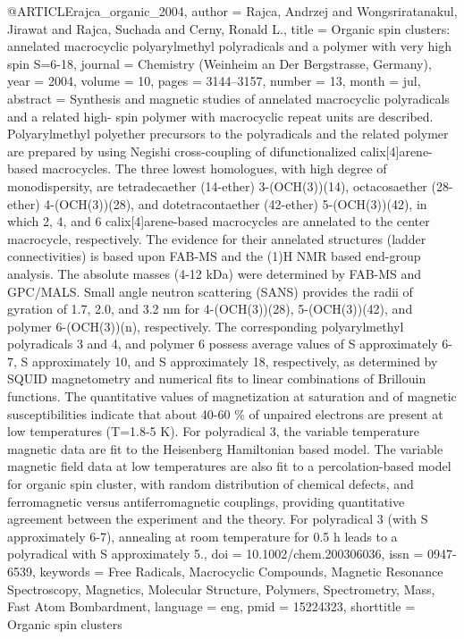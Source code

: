 @ARTICLE{rajca_organic_2004,
  author = {Rajca, Andrzej and Wongsriratanakul, Jirawat and Rajca, Suchada and
	Cerny, Ronald L.},
  title = {Organic spin clusters: annelated macrocyclic polyarylmethyl polyradicals
	and a polymer with very high spin {S}=6-18},
  journal = {Chemistry (Weinheim an Der Bergstrasse, Germany)},
  year = {2004},
  volume = {10},
  pages = {3144--3157},
  number = {13},
  month = jul,
  abstract = {Synthesis and magnetic studies of annelated macrocyclic polyradicals
	and a related high- spin polymer with macrocyclic repeat units are
	described. Polyarylmethyl polyether precursors to the polyradicals
	and the related polymer are prepared by using Negishi cross-coupling
	of difunctionalized calix[4]arene-based macrocycles. The three lowest
	homologues, with high degree of monodispersity, are tetradecaether
	(14-ether) 3-(OCH(3))(14), octacosaether (28-ether) 4-(OCH(3))(28),
	and dotetracontaether (42-ether) 5-(OCH(3))(42), in which 2, 4, and
	6 calix[4]arene-based macrocycles are annelated to the center macrocycle,
	respectively. The evidence for their annelated structures (ladder
	connectivities) is based upon FAB-MS and the (1)H NMR based end-group
	analysis. The absolute masses (4-12 kDa) were determined by FAB-MS
	and GPC/MALS. Small angle neutron scattering (SANS) provides the
	radii of gyration of 1.7, 2.0, and 3.2 nm for 4-(OCH(3))(28), 5-(OCH(3))(42),
	and polymer 6-(OCH(3))(n), respectively. The corresponding polyarylmethyl
	polyradicals 3 and 4, and polymer 6 possess average values of S approximately
	6-7, S approximately 10, and S approximately 18, respectively, as
	determined by SQUID magnetometry and numerical fits to linear combinations
	of Brillouin functions. The quantitative values of magnetization
	at saturation and of magnetic susceptibilities indicate that about
	40-60 \% of unpaired electrons are present at low temperatures (T=1.8-5
	K). For polyradical 3, the variable temperature magnetic data are
	fit to the Heisenberg Hamiltonian based model. The variable magnetic
	field data at low temperatures are also fit to a percolation-based
	model for organic spin cluster, with random distribution of chemical
	defects, and ferromagnetic versus antiferromagnetic couplings, providing
	quantitative agreement between the experiment and the theory. For
	polyradical 3 (with S approximately 6-7), annealing at room temperature
	for 0.5 h leads to a polyradical with S approximately 5.},
  doi = {10.1002/chem.200306036},
  issn = {0947-6539},
  keywords = {Free Radicals, Macrocyclic Compounds, Magnetic Resonance Spectroscopy,
	Magnetics, Molecular Structure, Polymers, Spectrometry, Mass, Fast
	Atom Bombardment},
  language = {eng},
  pmid = {15224323},
  shorttitle = {Organic spin clusters}
}

